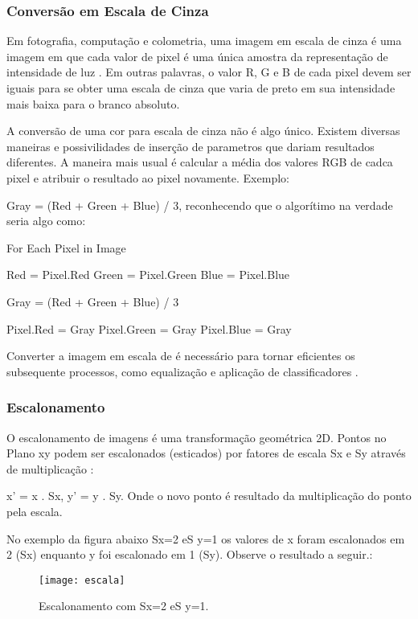 \subsubsection{Conversão em Escala de Cinza}\label{subsubsec:filtros}

Em fotografia, computação e colometria, uma imagem em escala de cinza é uma imagem em que cada valor de pixel é uma única amostra da representação de intensidade de luz \cite{stephen_greyscale}. Em outras palavras, o valor R, G e B de cada pixel devem ser iguais para se obter uma escala de cinza que varia de preto em sua intensidade mais baixa para o branco absoluto.

A conversão de uma cor para escala de cinza não é algo único. Existem diversas maneiras e possivilidades de inserção de parametros que dariam resultados diferentes. A maneira mais usual é calcular a média dos valores RGB de cadca pixel e atribuir o resultado ao pixel novamente. Exemplo:

Gray = (Red + Green + Blue) / 3, reconhecendo que o algorítimo na verdade seria algo como:

For Each Pixel in Image {
	
	Red = Pixel.Red
	Green = Pixel.Green
	Blue = Pixel.Blue
	
	Gray = (Red + Green + Blue) / 3
	
	Pixel.Red = Gray
	Pixel.Green = Gray
	Pixel.Blue = Gray
	
}

Converter a imagem em escala de é necessário para tornar eficientes os subsequente processos, como equalização e aplicação de classificadores \cite{drmathew_java_programming}.


\subsubsection{Escalonamento}\label{subsubsec:escalonamento}

O escalonamento de imagens é uma transformação geométrica 2D. Pontos no Plano xy podem ser escalonados (esticados) por fatores de escala Sx e Sy através de multiplicação \cite{lapix_escala}:

x’ = x . Sx, y’ = y . Sy.
Onde o novo ponto é resultado da multiplicação do ponto pela escala.

No exemplo da figura abaixo Sx=2 eS y=1 os valores de x foram escalonados em 2 (Sx) enquanto y foi escalonado em 1 (Sy). Observe o resultado a seguir.:

\begin{figure}[h]
	\centering
	\texttt{[image: escala]}
	\caption{Escalonamento com Sx=2 eS y=1.}
	\label{fig:escala}
\end{figure}


